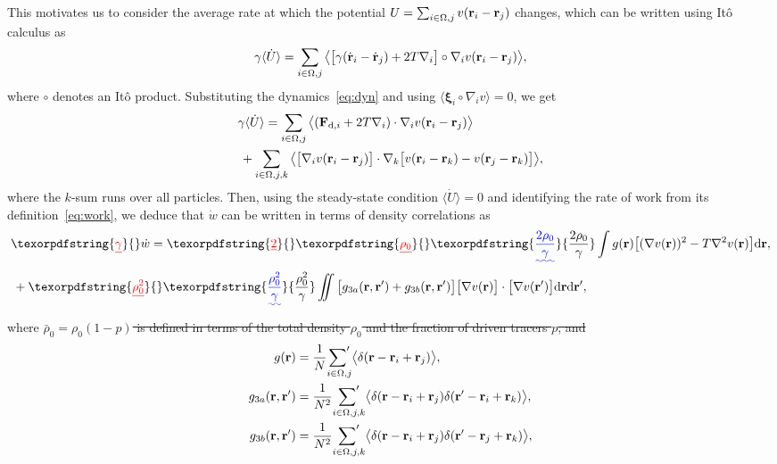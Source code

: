 \documentclass[superscriptaddress, twocolumn, prx, longbibliography, nofootinbib]{revtex4-1}
\newcommand{\dd}{\text{d}}
\providecommand{\DIFaddtex}[1]{{\protect\color{blue}\uwave{#1}}} %
\providecommand{\DIFdeltex}[1]{{\protect\color{red}\sout{#1}}}                      %
\providecommand{\DIFaddbegin}{} %
\providecommand{\DIFaddend}{} %
\providecommand{\DIFdelbegin}{} %
\providecommand{\DIFdelend}{} %
\providecommand{\DIFadd}[1]{\texorpdfstring{\DIFaddtex{#1}}{#1}} %
\providecommand{\DIFdel}[1]{\texorpdfstring{\DIFdeltex{#1}}{}} %
\begin{document}
This motivates us to consider the average rate at which the potential $U = \sum_{i\in\Omega,j} v({\bf r}_i-{\bf r}_j)$ changes, which can be written using It\^o calculus as
\begin{equation}
	\gamma\langle\dot U \rangle = \sum_{i\in\Omega,j} \big\langle\big[\gamma(\dot{\bf r}_i - \dot{\bf r}_j) + 2 T \nabla_i\big] \circ \nabla_i v({\bf r}_i-{\bf r}_j)\big\rangle ,
\end{equation}
where $\circ$ denotes an It\^o product. Substituting the dynamics~\eqref{eq:dyn} and using $\langle{\boldsymbol\xi}_i\circ\nabla_i v\rangle=0$, we get
\begin{equation}\label{eq:dotU}
	\begin{aligned}
		&\gamma\langle\dot U \rangle = \sum_{i\in\Omega,j} \big\langle({\bf F}_{{\rm d},i} + 2 T \nabla_i) \cdot \nabla_i v({\bf r}_i-{\bf r}_j)\big\rangle
		\\
		&\,+ \sum_{i\in\Omega,j,k} \big\langle \big[\nabla_i v({\bf r}_i-{\bf r}_j)\big]\cdot \nabla_k \big[ v({\bf r}_i-{\bf r}_k) - v({\bf r}_j-{\bf r}_k) \big] \big\rangle ,
    \end{aligned}
\end{equation}
where the $k$-sum runs over all particles. Then, using the steady-state condition $\langle\dot U \rangle=0$ and identifying the rate of work from its definition~\eqref{eq:work}, we deduce that $\dot w$ can be written in terms of density correlations as
\begin{equation}\label{eq:balance}
	\begin{aligned}
		&\DIFdelbegin \DIFdel{\gamma}\DIFdelend \dot w = \DIFdelbegin \DIFdel{2}%
\DIFdel{\rho_0 }\DIFdelend \DIFaddbegin \DIFadd{\frac{2\rho_0}{\gamma} }\DIFaddend \int g({\bf r}) \big[(\nabla v({\bf r}))^2 - T \nabla^2 v({\bf r})\big] \dd{\bf r} ,
		\\
		&\, + \DIFdelbegin %
\DIFdel{\rho_0^2 }\DIFdelend \DIFaddbegin \DIFadd{\frac{\rho_0^2}{\gamma} }\DIFaddend \iint\big[ g_{3a}({\bf r}, {\bf r}') + g_{3b}({\bf r}, {\bf r}')\big]  \big[\nabla v({\bf r})\big] \cdot \big[\nabla v({\bf r}')\big] \dd{\bf r} \dd{\bf r}' ,
	\end{aligned}
\end{equation}
where
\DIFdelbegin \DIFdel{$\bar\rho_0 = \rho_0(1-p)$ is defined in terms of the total density $\rho_0$ and the fraction of driven tracers $p$, and
}\DIFdelend \begin{equation}
	\begin{aligned}
 		g({\bf r}) &= \frac{1}{N} \underset{i\in\Omega,j}{{\sum}'} \big\langle \delta({\bf r}-{\bf r}_i+{\bf r}_j)\big\rangle ,
		\\
 		g_{3a}({\bf r},{\bf r}') &= \frac{1}{N^2} \underset{i\in\Omega,j,k}{{\sum}'} \big\langle \delta({\bf r}-{\bf r}_i+{\bf r}_j) \delta({\bf r}'-{\bf r}_i+{\bf r}_k)\big\rangle ,
		\\
 		g_{3b}({\bf r},{\bf r}') &= \frac{1}{N^2} \underset{i\in\Omega,j,k}{{\sum}'} \big\langle \delta({\bf r}-{\bf r}_i+{\bf r}_j) \delta({\bf r}'-{\bf r}_j+{\bf r}_k)\big\rangle ,
	\end{aligned}
\end{equation}
\end{document}
